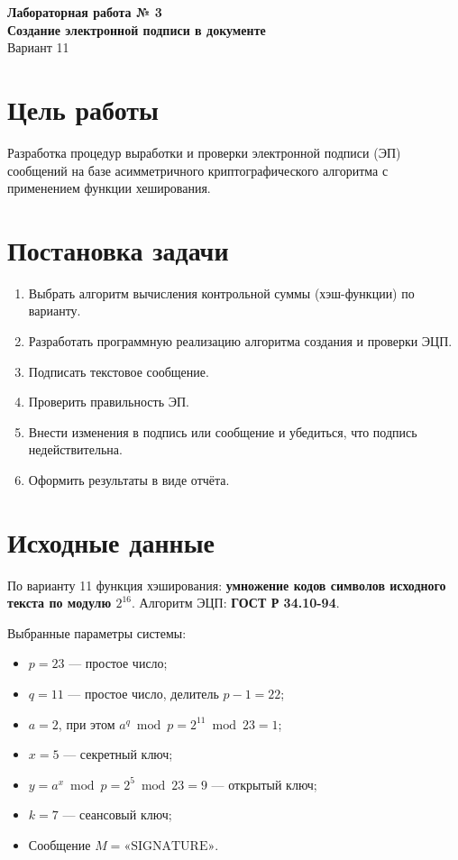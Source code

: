 \documentclass[12pt]{article}
\begin{document}
\begin{center}
\textbf{Лабораторная работа № 3}\\
\textbf{Создание электронной подписи в документе}\\
Вариант 11
\end{center}

\section{Цель работы}
Разработка процедур выработки и проверки электронной подписи (ЭП) сообщений на базе асимметричного криптографического алгоритма с применением функции хеширования.

\section{Постановка задачи}
\begin{enumerate}
    \item Выбрать алгоритм вычисления контрольной суммы (хэш-функции) по варианту.
    \item Разработать программную реализацию алгоритма создания и проверки ЭЦП.
    \item Подписать текстовое сообщение.
    \item Проверить правильность ЭП.
    \item Внести изменения в подпись или сообщение и убедиться, что подпись недействительна.
    \item Оформить результаты в виде отчёта.
\end{enumerate}

\section{Исходные данные}
По варианту 11 функция хэширования: \textbf{умножение кодов символов исходного текста по модулю \(2^{16}\)}. Алгоритм ЭЦП: \textbf{ГОСТ Р 34.10-94}. 

Выбранные параметры системы:
\begin{itemize}
    \item \(p = 23\) — простое число;
    \item \(q = 11\) — простое число, делитель \(p-1=22\);
    \item \(a = 2\), при этом \(a^q \bmod p = 2^{11} \bmod 23 = 1\);
    \item \(x = 5\) — секретный ключ;
    \item \(y = a^x \bmod p = 2^5 \bmod 23 = 9\) — открытый ключ;
    \item \(k = 7\) — сеансовый ключ;
    \item Сообщение \(M = \text{«SIGNATURE»}\).
\end{itemize}
\end{document}

